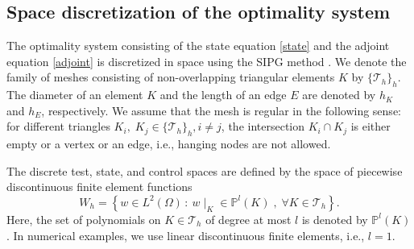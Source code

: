 \documentclass[preprint,12pt]{elsarticle}
\newcommand{\set}[2]{\left\{{#1}\,:~{#2}\right\}}
\begin{document}
\subsection{Space discretization of the optimality system}
\label{disc_state}

The optimality system consisting of the state equation \eqref{state} and the adjoint equation \eqref{adjoint} is discretized in space using the SIPG method \cite{riviere08dgm}. We denote the family of meshes consisting of non-overlapping triangular elements $K$  by $\{\mathcal{T}_h\}_h$. The diameter of an element $K$ and the length  of an edge $E$ are denoted by $h_K$ and $h_E$, respectively. We assume
that the mesh is regular in the following sense: for different triangles $K_i,\; K_j  \in \{\mathcal{T}_h\}_h, i \neq j$, the intersection $K_i \cap K_j$ is either empty or a vertex or an edge, i.e., hanging nodes are not allowed.


The discrete test, state, and control spaces are defined  by the  space of piecewise  discontinuous  finite element functions
\begin{equation*}
W_{h} = \set{w \in L^2(\Omega)}{ w\mid_{K}\in \mathbb{P}^l(K) \; , \; \forall K \in \mathcal{T}_h}.
\end{equation*}
Here, the set of  polynomials on $K \in \mathcal{T}_h$ of degree at most $l$ is denoted by $\mathbb{P}^l(K)$. In numerical examples, we use linear discontinuous finite elements, i.e., $l=1$.
\end{document}
